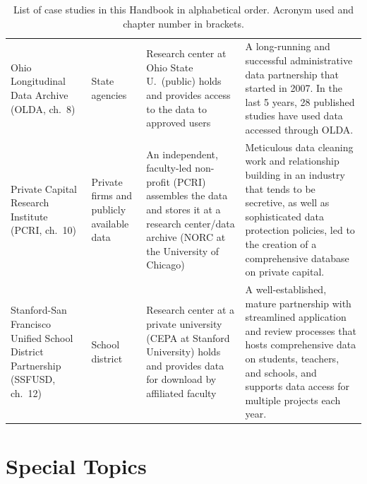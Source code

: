 \documentclass[11pt]{book}
\begin{document}
\begin{table}
\begin{tabular}[t]{>{\raggedright\arraybackslash}p{12em}>{\raggedright\arraybackslash}p{8em}>{\raggedright\arraybackslash}p{20em}>{\raggedright\arraybackslash}p{24em}}
Ohio Longitudinal Data Archive (OLDA, ch.\ 8) & State agencies & Research center at Ohio State U.\ (public) holds and provides access to the data to approved users & A long-running and successful administrative data partnership that started in 2007. In the last 5 years, 28 published studies have used data accessed through OLDA.\\
Private Capital Research Institute (PCRI, ch.\ 10) & Private firms and publicly available data & An independent, faculty-led non-profit (PCRI) assembles the data and stores it at a research center/data archive (NORC at the University of Chicago) & Meticulous data cleaning work and relationship building in an industry that tends to be secretive, as well as sophisticated data protection policies, led to the creation of a comprehensive database on private capital.\\
Stanford-San Francisco Unified School District Partnership (SSFUSD, ch.\ 12) & School district & Research center at a private university (CEPA at Stanford University) holds and provides data for download by affiliated faculty & A well-established, mature partnership with streamlined application and review processes that hosts comprehensive data on students, teachers, and schools, and supports data access for multiple projects each year.\\
\bottomrule
\end{tabular}
\caption{\label{tab:introtable1}List of case studies in this Handbook in alphabetical order. Acronym used and chapter number in brackets.}

\end{table}



\hypertarget{part-special-topics}{%
\part*{Special Topics}\label{part-special-topics}}





\end{document}
